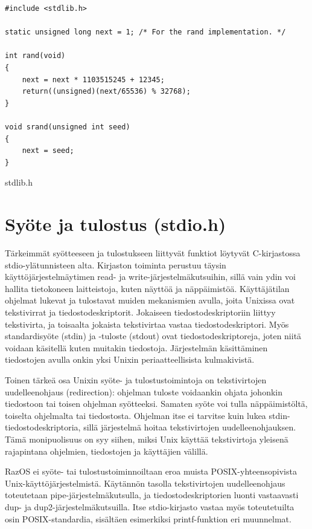 \begin{listing}[H]
\begin{verbatim}
#include <stdlib.h>

static unsigned long next = 1; /* For the rand implementation. */

int rand(void)
{
	next = next * 1103515245 + 12345;
	return((unsigned)(next/65536) % 32768);
}

void srand(unsigned int seed)
{
	next = seed;
}
\end{verbatim}
\caption{stdlib.h}
\label{lst:stdlib}
\end{listing}

\section{Syöte ja tulostus (stdio.h)}

Tärkeimmät syötteeseen ja tulostukseen liittyvät funktiot löytyvät C-kirjastossa stdio-ylätunnisteen alta. Kirjaston toiminta perustuu täysin käyttöjärjestelmäytimen read- ja write-järjestelmäkutsuihin, sillä vain ydin voi hallita tietokoneen laitteistoja, kuten näyttöä ja näppäimistöä. Käyttäjätilan ohjelmat lukevat ja tulostavat muiden mekanismien avulla, joita Unixissa ovat tekstivirrat ja tiedostodeskriptorit. Jokaiseen tiedostodeskriptoriin liittyy tekstivirta, ja toisaalta jokaista tekstivirtaa vastaa tiedostodeskriptori. Myös standardisyöte (stdin) ja -tuloste (stdout) ovat tiedostodeskriptoreja, joten niitä voidaan käsitellä kuten muitakin tiedostoja. Järjestelmän käsittäminen tiedostojen avulla onkin yksi Unixin periaatteellisista kulmakivistä.

\par

Toinen tärkeä osa Unixin syöte- ja tulostustoimintoja on tekstivirtojen uudelleenohjaus (redirection): ohjelman tuloste voidaankin ohjata johonkin tiedostoon tai toisen ohjelman syötteeksi. Samaten syöte voi tulla näppäimistöltä, toiselta ohjelmalta tai tiedostosta. Ohjelman itse ei tarvitse kuin lukea stdin-tiedostodeskriptoria, sillä järjestelmä hoitaa tekstivirtojen uudelleenohjauksen. Tämä monipuolisuus on syy siihen, miksi Unix käyttää tekstivirtoja yleisenä rajapintana ohjelmien, tiedostojen ja käyttäjien välillä.

\par

RazOS ei syöte- tai tulostustoiminnoiltaan eroa muista POSIX-yhteensopivista Unix-käyttöjärjestelmistä. Käytännön tasolla tekstivirtojen uudelleenohjaus toteutetaan pipe-järjestelmäkutsulla, ja tiedostodeskriptorien luonti vastaavasti dup- ja dup2-järjestelmäkutsuilla. Itse stdio-kirjasto vastaa myös toteutetuilta osin POSIX-standardia, sisältäen esimerkiksi printf-funktion eri muunnelmat.

